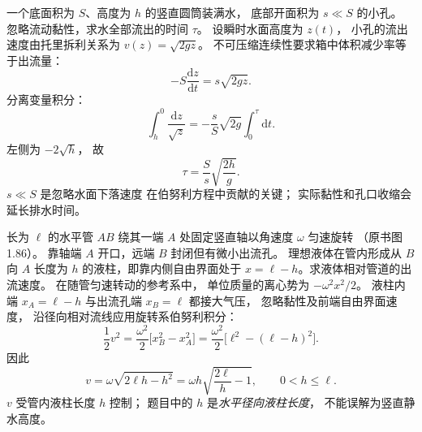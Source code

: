 一个底面积为 $S$、高度为 $h$ 的竖直圆筒装满水，
底部开面积为 $s\ll S$ 的小孔。
忽略流动黏性，求水全部流出的时间 $\tau$。
\exsolution
设瞬时水面高度为 $z(t)$，
小孔的流出速度由托里拆利关系为
$v(z)=\sqrt{2gz}$。
不可压缩连续性要求箱中体积减少率等于出流量：
\[
-S\frac{\mathrm dz}{\mathrm dt}
=s\sqrt{2gz}.
\]
分离变量积分：
\[
\int_h^0\frac{\mathrm dz}{\sqrt z}
=-\frac{s}{S}\sqrt{2g}\int_0^\tau\mathrm dt.
\]
左侧为 $-2\sqrt h$，
故
\[
\boxed{\tau=\frac{S}{s}\sqrt{\frac{2h}{g}}}.
\]
\excheck $s\ll S$ 是忽略水面下落速度
在伯努利方程中贡献的关键；
实际黏性和孔口收缩会延长排水时间。

长为 $\ell$ 的水平管 $AB$ 绕其一端 $A$
处固定竖直轴以角速度 $\omega$ 匀速旋转
（原书图1.86）。
靠轴端 $A$ 开口，远端 $B$ 封闭但有微小出流孔。
理想液体在管内形成从 $B$ 向 $A$
长度为 $h$ 的液柱，即靠内侧自由界面处于
$x=\ell-h$。求液体相对管道的出流速度。
\exsolution
在随管匀速转动的参考系中，
单位质量的离心势为 $-\omega^2x^2/2$。
液柱内端 $x_A=\ell-h$
与出流孔端 $x_B=\ell$ 都接大气压，
忽略黏性及前端自由界面速度，
沿径向相对流线应用旋转系伯努利积分：
\[
\frac12v^2
=\frac{\omega^2}{2}
\bigl[x_B^2-x_A^2\bigr]
=\frac{\omega^2}{2}\bigl[\ell^2-(\ell-h)^2\bigr].
\]
因此
\[
\boxed{v=\omega\sqrt{2\ell h-h^2}
=\omega h\sqrt{\frac{2\ell}{h}-1}},
\qquad 0<h\le\ell.
\]
\excheck $v$ 受管内液柱长度 $h$ 控制；
题目中的 $h$ 是\emph{水平径向液柱长度}，
不能误解为竖直静水高度。
